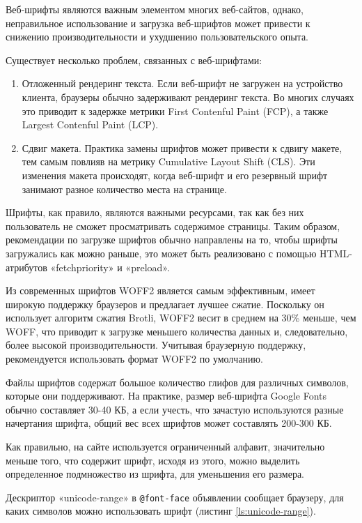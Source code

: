 Веб-шрифты являются важным элементом многих веб-сайтов, однако, неправильное использование и загрузка веб-шрифтов может привести к снижению производительности и ухудшению пользовательского опыта.

Существует несколько проблем, связанных с веб-шрифтами:

\begin{enumerate} 
  \item Отложенный рендеринг текста. Если веб-шрифт не загружен на устройство клиента, браузеры обычно задерживают рендеринг текста. Во многих случаях это приводит к задержке метрики First Contenful Paint (FCP), а также Largest Contenful Paint (LCP).
  
  \item Сдвиг макета. Практика замены шрифтов может привести к сдвигу макете, тем самым повлияв на метрику Cumulative Layout Shift (CLS). Эти изменения макета происходят, когда веб-шрифт и его резервный шрифт занимают разное количество места на странице.
\end{enumerate}

Шрифты, как правило, являются важными ресурсами, так как без них пользователь не сможет просматривать содержимое страницы. Таким образом, рекомендации по загрузке шрифтов обычно направлены на то, чтобы шрифты загружались как можно раньше, это может быть реализовано с помощью HTML-атрибутов «fetchpriority» и «preload».

Из современных шрифтов WOFF2 является самым эффективным, имеет широкую поддержку браузеров и предлагает лучшее сжатие. Поскольку он использует алгоритм сжатия Brotli, WOFF2 весит в среднем на 30\% меньше, чем WOFF, что приводит к загрузке меньшего количества данных и, следовательно, более высокой производительности. Учитывая браузерную поддержку, рекомендуется использовать  формат WOFF2 по умолчанию.

Файлы шрифтов содержат большое количество глифов для различных символов, которые они поддерживают. На практике, размер веб-шрифта Google Fonts обычно составляет 30-40 КБ, а если учесть, что зачастую используются разные начертания шрифта, общий вес всех шрифтов может составлять 200-300 КБ.

Как правильно, на сайте используется ограниченный алфавит, значительно меньше того, что содержит шрифт, исходя из этого, можно выделить определенное подмножество из шрифта, для уменьшения его размера.

Дескриптор «unicode-range» в \verb|@font-face| объявлении сообщает браузеру, для каких символов можно использовать шрифт (листинг \ref{ls:unicode-range}).

